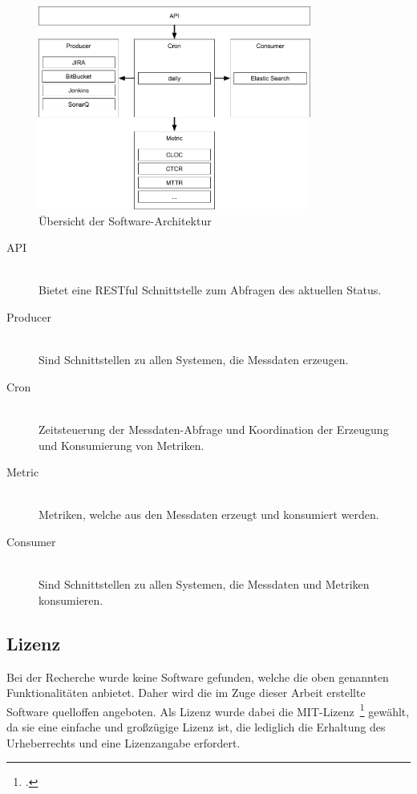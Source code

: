 \begin{savenotes}
    \begin{figure}[H] 
        \centering
            \includegraphics[width=0.8\textwidth]{img/architecture-overview.png}
        \caption{Übersicht der Software-Architektur}\label{fig:overview_architecture}
    \end{figure}
\end{savenotes}

\begin{description}
    \item[API] \hfill \\ Bietet eine RESTful Schnittstelle zum Abfragen des aktuellen Status.
    \item[Producer] \hfill \\ Sind Schnittstellen zu allen Systemen, die Messdaten erzeugen.
    \item[Cron] \hfill \\ Zeitsteuerung der Messdaten-Abfrage und Koordination der Erzeugung und Konsumierung von Metriken.
    \item[Metric] \hfill \\ Metriken, welche aus den Messdaten erzeugt und konsumiert werden.
    \item[Consumer] \hfill \\ Sind Schnittstellen zu allen Systemen, die Messdaten und Metriken konsumieren.
\end{description}

\subsection{Lizenz}

Bei der Recherche wurde keine Software gefunden, welche die oben genannten Funktionalitäten anbietet.
Daher wird die im Zuge dieser Arbeit erstellte Software quelloffen angeboten.
Als Lizenz wurde dabei die MIT-Lizenz~\footcite{mit_license} gewählt, da sie eine einfache und großzügige Lizenz ist, die lediglich die Erhaltung des Urheberrechts und eine Lizenzangabe erfordert.

